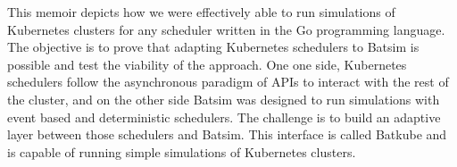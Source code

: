 This memoir depicts how we were effectively able to run simulations of
Kubernetes clusters for any scheduler written in the Go programming language.
The objective is to prove that adapting Kubernetes schedulers to Batsim is
possible and test the viability of the approach. One one side, Kubernetes
schedulers follow the asynchronous paradigm of APIs to interact with the rest
of the cluster, and on the other side Batsim was designed to run simulations
with event based and deterministic schedulers.  The challenge is to build an
adaptive layer between those schedulers and Batsim. This interface is called
Batkube and is capable of running simple simulations of Kubernetes clusters.
